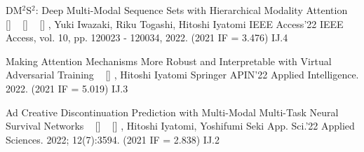 
\begin{publications}
    \publication
    {DM$^2$S$^2$: Deep Multi-Modal Sequence Sets with Hierarchical Modality Attention}
    {
    ~ [\href{https://doi.org/10.1109/ACCESS.2022.3221812}{\small{\doiSymbol}}]
    ~ [\href{https://arxiv.org/abs/2209.03126}{\small{\arxivSymbol}}]
    ~ [\href{https://doi.org/10.5281/zenodo.7050923}{\small{\linkSymbol}}]
    }
    {\underline{}, Yuki Iwazaki, Riku Togashi, Hitoshi Iyatomi}
    {IEEE Access'22} {IEEE Access, vol. 10, pp. 120023 - 120034, 2022. (2021 IF = 3.476)} {IJ.4}

    \publication
    {Making Attention Mechanisms More Robust and Interpretable with Virtual Adversarial Training}
    {
    ~ [\href{https://arxiv.org/abs/2104.08763}{\small{\arxivSymbol}}]
    }
    {\underline{}, Hitoshi Iyatomi}
    {Springer APIN'22} {Applied Intelligence. 2022. (2021 IF = 5.019)} {IJ.3}

    \publication
    {Ad Creative Discontinuation Prediction with Multi-Modal Multi-Task Neural Survival Networks}
    {
    ~ [\href{https://doi.org/10.3390/app12073594}{\small{\doiSymbol}}]
    ~ [\href{https://arxiv.org/abs/2204.11588}{\small{\arxivSymbol}}]
    }
    {\underline{}, Hitoshi Iyatomi, Yoshifumi Seki}
    {App. Sci.'22} {Applied Sciences. 2022; 12(7):3594. (2021 IF = 2.838)} {IJ.2}
\end{publications}


